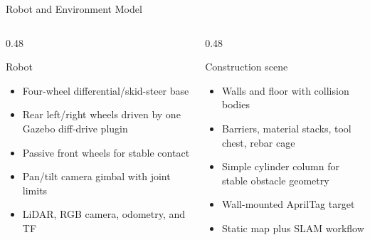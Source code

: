 \documentclass[aspectratio=169,11pt]{beamer}
\begin{document}
\begin{frame}{Robot and Environment Model}
  \begin{columns}[T,onlytextwidth]
    \begin{column}{0.48\textwidth}
      \begin{block}{Robot}
        \begin{itemize}
          \item Four-wheel differential/skid-steer base
          \item Rear left/right wheels driven by one Gazebo diff-drive plugin
          \item Passive front wheels for stable contact
          \item Pan/tilt camera gimbal with joint limits
          \item LiDAR, RGB camera, odometry, and TF
        \end{itemize}
      \end{block}
    \end{column}
    \begin{column}{0.48\textwidth}
      \begin{block}{Construction scene}
        \begin{itemize}
          \item Walls and floor with collision bodies
          \item Barriers, material stacks, tool chest, rebar cage
          \item Simple cylinder column for stable obstacle geometry
          \item Wall-mounted AprilTag target
          \item Static map plus SLAM workflow
        \end{itemize}
      \end{block}
    \end{column}
  \end{columns}
\end{frame}
\end{document}
